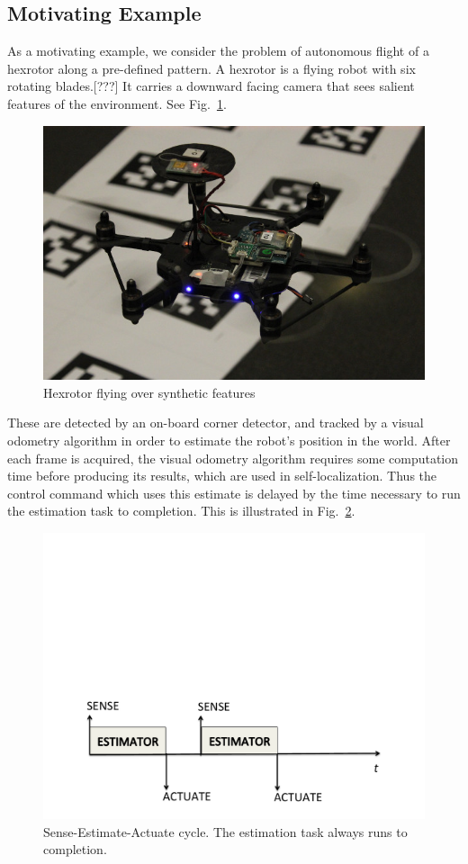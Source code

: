 \subsection{Motivating Example}
\label{motivatingExample}

As a motivating example, we consider the problem of autonomous flight of a hexrotor along a pre-defined pattern.
A hexrotor is a flying robot with six rotating blades.[???]
It carries a downward facing camera that sees salient features of the environment.
See Fig.~\ref{fig:hexrotor}.
\begin{figure}[htp]
	\centering
	\includegraphics[width=0.9\columnwidth]{figures/nanohex}
	\caption{Hexrotor flying over synthetic features}
	\label{fig:hexrotor}
\end{figure}
These are detected by an on-board corner detector, and tracked by a visual odometry algorithm in order to estimate the robot's position in the world.
After each frame is acquired, the visual odometry algorithm requires some computation time before producing its results, which are used in self-localization.
Thus the control command which uses this estimate is delayed by the time necessary to run the estimation task to completion.
This is illustrated in Fig.~\ref{fig:senseActuate}.
\begin{figure}[t]
	\centering
	\includegraphics[width=0.9\columnwidth]{figures/senseActuate}
	\caption{Sense-Estimate-Actuate cycle. The estimation task always runs to completion.}
	\label{fig:senseActuate}
\end{figure}
